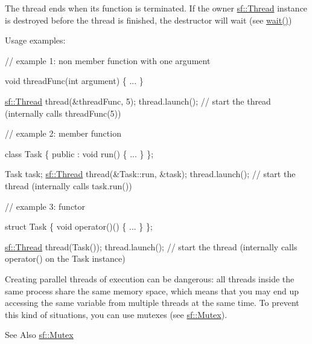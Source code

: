 The thread ends when its function is terminated. If the owner \hyperlink{classsf_1_1Thread}{sf\-::\-Thread} instance is destroyed before the thread is finished, the destructor will wait (see \hyperlink{classsf_1_1Thread_a724b1f94c2d54f84280f2f78bde95fa0}{wait()})

Usage examples\-: 
\begin{DoxyCode}
\textcolor{comment}{// example 1: non member function with one argument}

\textcolor{keywordtype}{void} threadFunc(\textcolor{keywordtype}{int} argument)
\{
    ...
\}

\hyperlink{classsf_1_1Thread}{sf::Thread} thread(&threadFunc, 5);
thread.launch(); \textcolor{comment}{// start the thread (internally calls threadFunc(5))}
\end{DoxyCode}



\begin{DoxyCode}
\textcolor{comment}{// example 2: member function}

\textcolor{keyword}{class }Task
\{
\textcolor{keyword}{public} :
    \textcolor{keywordtype}{void} run()
    \{
        ...
    \}
\};

Task task;
\hyperlink{classsf_1_1Thread}{sf::Thread} thread(&Task::run, &task);
thread.launch(); \textcolor{comment}{// start the thread (internally calls task.run())}
\end{DoxyCode}



\begin{DoxyCode}
\textcolor{comment}{// example 3: functor}

\textcolor{keyword}{struct }Task
\{
    \textcolor{keywordtype}{void} operator()()
    \{
        ...
    \}
\};

\hyperlink{classsf_1_1Thread}{sf::Thread} thread(Task());
thread.launch(); \textcolor{comment}{// start the thread (internally calls operator() on the Task instance)}
\end{DoxyCode}


Creating parallel threads of execution can be dangerous\-: all threads inside the same process share the same memory space, which means that you may end up accessing the same variable from multiple threads at the same time. To prevent this kind of situations, you can use mutexes (see \hyperlink{classsf_1_1Mutex}{sf\-::\-Mutex}).

\begin{DoxySeeAlso}{See Also}
\hyperlink{classsf_1_1Mutex}{sf\-::\-Mutex} 
\end{DoxySeeAlso}


